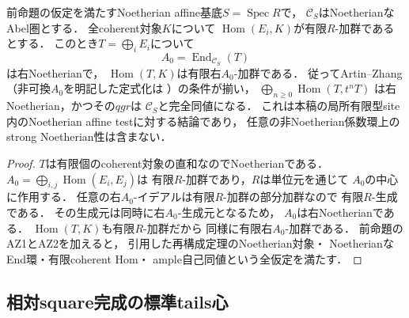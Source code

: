 \begin{lemma}
\label{lem:qa-relative-az-endring-finiteness}
前命題の仮定を満たすNoetherian
affine基底$S=\operatorname{Spec}R$で，
$\mathcal C_S$はNoetherianなAbel圏とする．
全coherent対象$K$について
$\operatorname{Hom}(E_i,K)$が有限$R$-加群であるとする．
このとき$T=\bigoplus_iE_i$について
\[
 A_0=\operatorname{End}_{\mathcal C_S}(T)
\]
は右Noetherianで，
$\operatorname{Hom}(T,K)$は有限右$A_0$-加群である．
従ってArtin--Zhang
\cite[Theorem 4.5(1)]{AZ1994}
（非可換$A_0$を明記した定式化は
\cite[Theorem 7.3]{OACU2026}）の条件が揃い，
$\bigoplus_{n\ge0}\operatorname{Hom}(T,t^nT)$
は右Noetherian，かつその$qgr$は
$\mathcal C_S$と完全同値になる．
これは本稿の局所有限型site内のNoetherian affine
testに対する結論であり，
任意の非Noetherian係数環上のstrong Noetherian性は含まない．
\end{lemma}
\begin{proof}
$T$は有限個のcoherent対象の直和なのでNoetherianである．
$A_0=\bigoplus_{i,j}\operatorname{Hom}(E_i,E_j)$は
有限$R$-加群であり，$R$は単位元を通じて
$A_0$の中心に作用する．
任意の右$A_0$-イデアルは有限$R$-加群の部分加群なので
有限$R$-生成である．
その生成元は同時に右$A_0$-生成元となるため，
$A_0$は右Noetherianである．
$\operatorname{Hom}(T,K)$も有限$R$-加群だから
同様に有限右$A_0$-加群である．
前命題のAZ1とAZ2を加えると，
引用した再構成定理のNoetherian対象・
NoetherianなEnd環・有限coherent Hom・
ample自己同値という全仮定を満たす．
\end{proof}

\subsection{相対square完成の標準tails心}
\label{subsec:qa-relative-square-tails-heart}

